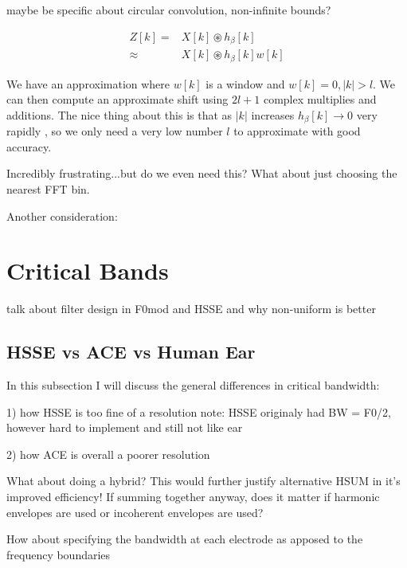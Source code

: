 \documentclass [11pt, proquest] {uwthesis}[2015/03/03]
\begin{document}
maybe be specific about circular convolution, non-infinite bounds?

\begin{align}
Z[k] =& X[k] \circledast h_\beta[k] \nonumber \\
\approx& X[k] \circledast h_\beta[k]w[k]
\end{align}

We have an approximation where $w[k]$ is a window and $w[k] = 0, |k| > l$.  We can then compute an approximate shift using $2l + 1$ complex multiplies and additions.  The nice thing about this is that as $|k|$ increases $h_\beta[k] \rightarrow 0$ very rapidly , so we only need a very low number $l$ to approximate with good accuracy.






Incredibly frustrating...but do we even need this?  What about just choosing the nearest FFT bin.

Another consideration: 

\section{Critical Bands}

talk about filter design in F0mod and HSSE and why non-uniform is better

\subsection{HSSE vs ACE vs Human Ear}

In this subsection I will discuss the general differences in critical bandwidth:

1) how HSSE is too fine of a resolution
note: HSSE originaly had BW = F0/2, however hard to implement and still not like ear

2) how ACE is overall a poorer resolution

What about doing a hybrid?  This would further justify alternative HSUM in it's improved efficiency!  If summing together anyway, does it matter if harmonic envelopes are used or incoherent envelopes are used?

How about specifying the bandwidth at each electrode as apposed to the frequency boundaries
\end{document}
